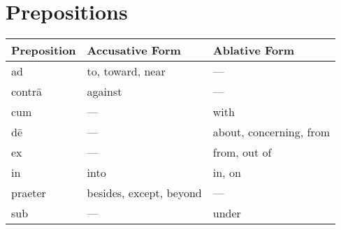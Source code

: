 \section{Prepositions}

\setlength\columnseprule{.4pt}
\renewcommand{\arraystretch}{2.5}

\vspace{3em}
\begin{tabu} to \linewidth{X[l]X[l]X[l]}\toprule
  Preposition & Accusative Form & Ablative Form \\\midrule
  ad        & to, toward, near        & --- \\
  contr\=a  & against                 & --- \\
  cum       & ---                     & with \\
  d\=e      & ---                     & about, concerning, from \\
  ex        & ---                     & from, out of \\
  in        & into                    & in, on \\
  praeter   & besides, except, beyond & --- \\
  sub       & ---                     & under \\
\end{tabu}
